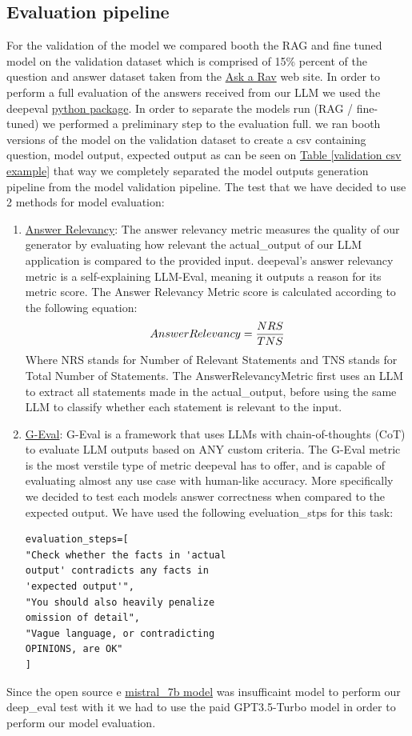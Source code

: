 \documentclass[11pt]{article}
\begin{document}
\subsection{Evaluation pipeline}

For the validation of the model we compared booth the RAG and fine tuned model on the validation dataset which is comprised of  15\% percent of the question and answer dataset taken from the \href{https://asktherav.com/ }{Ask a Rav} web site.
In order to perform a full evaluation of the answers received from our LLM we used the deepeval  \href{https://docs.confident-ai.com/ }{python package}.
In order to separate the models run (RAG / fine-tuned) we performed a preliminary step to the evaluation full. we ran booth versions of the model on the validation dataset to create a csv containing question, model output, expected output as can be seen on  \href{#tab:example}{Table \ref*{validation csv example}} that way we completely separated the model outputs generation pipeline  from the model validation pipeline.
The test that we have decided to use 2 methods for model evaluation:
\begin{enumerate}
    \item   \href{https://docs.confident-ai.com/docs/metrics-answer-relevancy }{Answer Relevancy}: The answer relevancy metric measures the quality of our generator by evaluating how relevant the actual\_output of our LLM application is compared to the provided input. deepeval's answer relevancy metric is a self-explaining LLM-Eval, meaning it outputs a reason for its metric score.
    The Answer Relevancy Metric score is calculated according to the following equation:
    \[Answer Relevancy = \\  \frac{NRS}{TNS} \]
    Where NRS stands for Number of Relevant Statements and TNS stands for Total Number of Statements.
    The AnswerRelevancyMetric first uses an LLM to extract all statements made in the actual\_output, before using the same LLM to classify whether each statement is relevant to the input.
     \item \href{https://docs.confident-ai.com/docs/metrics-llm-evals}{G-Eval}: G-Eval is a framework that uses LLMs with chain-of-thoughts (CoT) to evaluate LLM outputs based on ANY custom criteria. The G-Eval metric is the most verstile type of metric deepeval has to offer, and is capable of evaluating almost any use case with human-like accuracy.
     More specifically we decided to test each models answer correctness when compared to the expected output.
     We have used the following eveluation\_stps for this task:
     \begin{verbatim}
evaluation_steps=[
"Check whether the facts in 'actual 
output' contradicts any facts in
'expected output'",
"You should also heavily penalize
omission of detail",
"Vague language, or contradicting
OPINIONS, are OK"
]
    \end{verbatim}
    
\end{enumerate}
Since the open source e \href{https://mistral.ai/news/announcing-mistral-7b/ }{mistral\_7b model} was insufficaint model to perform our deep\_eval test with it we had to use the paid  GPT3.5-Turbo model in order to perform our model evaluation.
\end{document}
